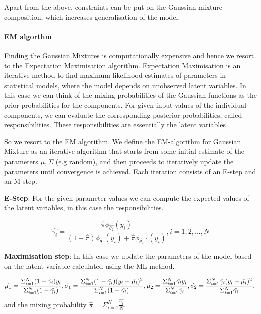 \documentclass{book}
\begin{document}
Apart from the above, constraints can be put on the Gaussian mixture composition, which increases generalisation of the model\cite{UL:8}.

\paragraph{EM algorthm}%
Finding the Gaussian Mixtures is computationally expensive and hence we resort to the Expectation Maximisation algorithm. Expectation Maximisation is an iterative method to find maximum likelihood estimates of parameters in statistical models, where the model depends on unobserved latent variables. In this case we can think of the mixing probabilities of the Gaussian functions as the prior probabilities for the components. For given input values of the individual components, we can evaluate the corresponding posterior probabilities, called responsibilities. These responsibilities are essentially the latent variables\cite{UL:3} .

So we resort to the EM algorithm. We define the EM-algorithm for Gaussian Mixture as an iterative algorithm that starts from some initial estimate of the parameters ${\mu, \Sigma}$ (e.g random), and then proceeds to iteratively update the parameters until convergence is achieved. Each iteration consists of an E-step and an M-step.

\textbf{E-Step}: For the given parameter values we can compute the expected values of the latent variables, in this case the responsibilities.

\begin{equation}
	\hat{\gamma_i} = \frac{\hat{\pi}\phi_{\hat{\theta_2}}(y_i)}{(1 - \hat{\pi})\phi_{\hat{\theta_1}}(y_i) + \hat{\pi}\phi_{\hat{\theta_2}} \cdot (y_i)}, i = 1, 2, ..., N
\end{equation}

\textbf{Maximisation step}: In this case we update the parameters of the model based on the latent variable calculated using the ML method.

\begin{equation}
	\hat{\mu_1} = \frac{\Sigma_{i=1}^{N}(1 - \hat{\gamma_i}) y_i}{\Sigma_{i=1}^{N}(1 - \hat{\gamma_i})}, \\
	\hat{\sigma_1} = \frac{\Sigma_{i=1}^{N}(1 - \hat{\gamma_i}) (y_i - \hat{\mu_i})^2}{\Sigma_{i=1}^{N}(1 - \hat{\gamma_i})}, \\
	\hat{\mu_2} = \frac{\Sigma_{i=1}^{N}\hat{\gamma_i} y_i}{\Sigma_{i=1}^{N}\hat{\gamma_i}}, \\
	\hat{\sigma_2} = \frac{\Sigma_{i=1}^{N}\hat{\gamma_i} (y_i - \hat{\mu_i})^2}{\Sigma_{i=1}^{N}\hat{\gamma_i}}, \\
\end{equation}
and the mixing probability $\hat{\pi} = \Sigma_{i=1}^{N}\frac{\hat{\gamma_i}}{N}$.
\label{par:em_algorthm}
\end{document}
